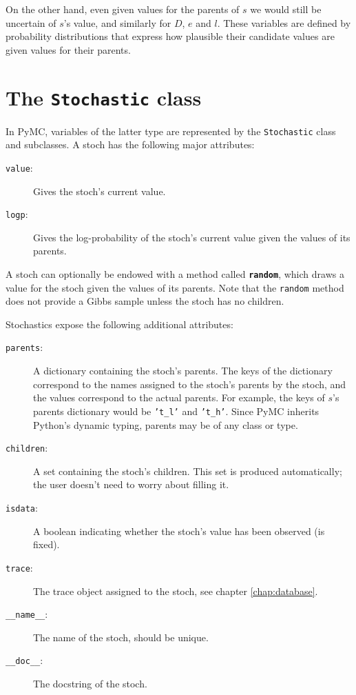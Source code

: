 On the other hand, even given values for the parents of $s$ we would still be uncertain of $s$'s value, and similarly for $D$, $e$ and $l$. These variables are defined by probability distributions that express how plausible their candidate values are given values for their parents.
 

\section{The \texttt{Stochastic} class}

In PyMC, variables of the latter type are represented by the \texttt{Stochastic} class and subclasses. A stoch has the following major attributes: 
\begin{description}
    \item[\texttt{value}:] Gives the stoch's current value.
    \item[\texttt{logp}:] Gives the log-probability of the stoch's current value given the values of its parents.
\end{description}
A stoch can optionally be endowed with a method called \texttt{\bfseries random}, which draws a value for the stoch given the values of its parents. Note that the \texttt{random} method does not provide a Gibbs sample unless the stoch has no children.

Stochastics expose the following additional attributes:
\begin{description}
    \item[\texttt{parents}:] A dictionary containing the stoch's parents. The keys of the dictionary correspond to the names assigned to the stoch's parents by the stoch, and the values correspond to the actual parents. For example, the keys of $s$'s parents dictionary would be \texttt{'t\_l'} and \texttt{'t\_h'}. Since PyMC inherits Python's dynamic typing, parents may be of any class or type.
    \item[\texttt{children}:] A set containing the stoch's children. This set is produced automatically; the user doesn't need to worry about filling it.
    \item[\texttt{isdata}:] A boolean indicating whether the stoch's value has been observed (is fixed).
    \item[\texttt{trace}:] The trace object assigned to the stoch, see chapter \ref{chap:database}.
    \item[\texttt{\_\_name\_\_}:] The name of the stoch, should be unique.
    \item[\texttt{\_\_doc\_\_}:] The docstring of the stoch.
\end{description}

